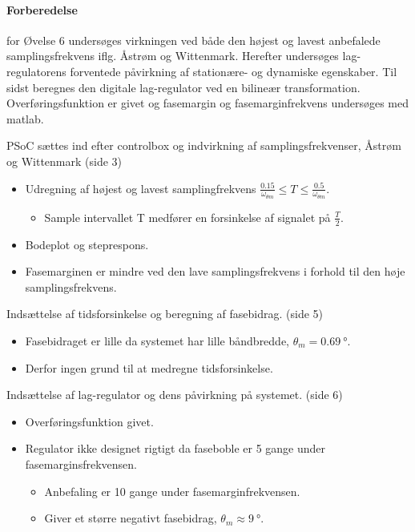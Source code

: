 \documentclass[danish]{article}
\begin{document}
\paragraph{Forberedelse} for Øvelse 6 undersøges virkningen ved både den højest og lavest anbefalede samplingsfrekvens iflg. Åstrøm og Wittenmark. Herefter undersøges lag-regulatorens forventede påvirkning af stationære- og dynamiske egenskaber. Til sidst beregnes den digitale lag-regulator ved en bilineær transformation.\\

Overføringsfunktion er givet og fasemargin og fasemarginfrekvens undersøges med matlab.

\vspace{3mm}
PSoC sættes ind efter controlbox og indvirkning af samplingsfrekvenser, Åstrøm og Wittenmark (side 3)
\begin{itemize}
	\item 	Udregning af højest og lavest samplingfrekvens $\frac{0.15}{\omega_{\theta m}} \leq T \leq\frac{0.5}{\omega_{\theta m}}$.
	\begin{itemize}
		\item Sample intervallet T medfører en forsinkelse af signalet på $\frac{T}{2}$.
	\end{itemize}
	\item Bodeplot og steprespons.
	\item Fasemarginen er mindre ved den lave samplingsfrekvens i forhold til den høje samplingsfrekvens.
\end{itemize}
\vspace{3mm}
Indsættelse af tidsforsinkelse og beregning af fasebidrag. (side 5)
\begin{itemize}
	\item Fasebidraget er lille da systemet har lille båndbredde, $\theta_m = \SI{0,69}{\degree}$.
	\item Derfor ingen grund til at medregne tidsforsinkelse.
\end{itemize}
\vspace{3mm}
Indsættelse af lag-regulator og dens påvirkning på systemet. (side 6)
\begin{itemize}
	\item Overføringsfunktion givet.
	\item Regulator ikke designet rigtigt da faseboble er 5 gange under fasemarginsfrekvensen.
	\begin{itemize}
		\item Anbefaling er 10 gange under fasemarginfrekvensen.
		\item Giver et større negativt fasebidrag, $\theta_m \approx \SI{9}{\degree}$.
	\end{itemize}
\end{itemize}
\end{document}

